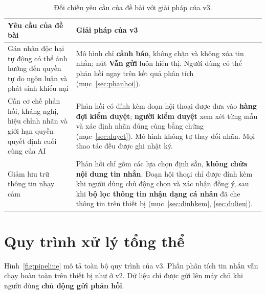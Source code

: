 \documentclass[11pt,a4paper]{article}
\begin{document}
\begin{table}[H]
\centering
\small
\begin{tabularx}{\linewidth}{@{}p{4.6cm}Y@{}}
\toprule
\textbf{Yêu cầu của đề bài} & \textbf{Giải pháp của v3} \\
\midrule
Gán nhãn độc hại tự động có thể ảnh hưởng đến quyền tự do ngôn luận và phát sinh khiếu nại &
Mô hình chỉ \textbf{cảnh báo}, không chặn và không xóa tin nhắn; nút \textbf{Vẫn gửi} luôn hiển thị.
Người dùng có thể phản hồi ngay trên kết quả phân tích (mục~\ref{sec:phanhoi}). \\
\addlinespace
Cần cơ chế phản hồi, kháng nghị, hiệu chỉnh nhãn và giới hạn quyền quyết định cuối cùng của AI &
Phản hồi có đính kèm đoạn hội thoại được đưa vào \textbf{hàng đợi kiểm duyệt}; \textbf{người kiểm duyệt}
xem xét từng mẫu và xác định nhãn đúng cùng bằng chứng (mục~\ref{sec:duyet}).
Mô hình không tự thay đổi nhãn. Mọi thao tác đều được ghi nhật ký. \\
\addlinespace
Giảm lưu trữ thông tin nhạy cảm &
Phản hồi chỉ gồm các lựa chọn định sẵn, \textbf{không chứa nội dung tin nhắn}. Đoạn hội thoại chỉ được đính
kèm khi người dùng chủ động chọn và xác nhận đồng ý, sau khi \textbf{bộ lọc thông tin nhận dạng cá nhân}
đã che thông tin trên thiết bị (mục~\ref{sec:dinhkem}, \ref{sec:dulieu}). \\
\bottomrule
\end{tabularx}
\caption{Đối chiếu yêu cầu của đề bài với giải pháp của v3.}
\label{tab:debai}
\end{table}

\newpage
\section{Quy trình xử lý tổng thể}
\label{sec:pipeline}

Hình~\ref{fig:pipeline} mô tả toàn bộ quy trình của v3. Phần phân tích tin nhắn vẫn chạy hoàn toàn trên
thiết bị như ở v2. Dữ liệu chỉ được gửi lên máy chủ khi người dùng \textbf{chủ động gửi phản hồi}.
\end{document}
